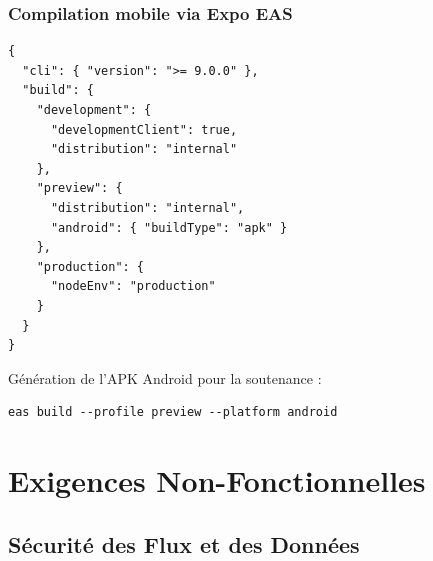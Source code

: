 \documentclass[12pt,a4paper]{report}
\begin{document}
\subsection{Compilation mobile via Expo EAS}

\begin{lstlisting}[language={}, caption={Configuration eas.json}]
{
  "cli": { "version": ">= 9.0.0" },
  "build": {
    "development": {
      "developmentClient": true,
      "distribution": "internal"
    },
    "preview": {
      "distribution": "internal",
      "android": { "buildType": "apk" }
    },
    "production": {
      "nodeEnv": "production"
    }
  }
}
\end{lstlisting}

Génération de l'APK Android pour la soutenance :
\begin{lstlisting}[language={}]
eas build --profile preview --platform android
\end{lstlisting}

\chapter{Exigences Non-Fonctionnelles}

\section{Sécurité des Flux et des Données}
\end{document}
